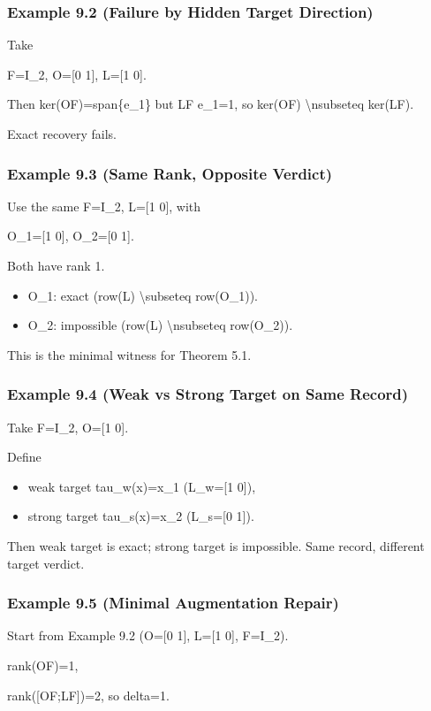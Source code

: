 \documentclass[11pt]{article}
\begin{document}
\subsubsection*{Example 9.2 (Failure by Hidden Target Direction)}
Take


F=I\_2, O=[0 1], L=[1 0].


Then ker(OF)=span\{e\_1\} but LF e\_1=1, so ker(OF) \textbackslash{}nsubseteq ker(LF).

Exact recovery fails.


\subsubsection*{Example 9.3 (Same Rank, Opposite Verdict)}
Use the same F=I\_2, L=[1 0], with


O\_1=[1 0], O\_2=[0 1].


Both have rank 1.

\begin{itemize}
\item O\_1: exact (row(L) \textbackslash{}subseteq row(O\_1)).
\item O\_2: impossible (row(L) \textbackslash{}nsubseteq row(O\_2)).
\end{itemize}

This is the minimal witness for Theorem 5.1.


\subsubsection*{Example 9.4 (Weak vs Strong Target on Same Record)}
Take F=I\_2, O=[1 0].

Define

\begin{itemize}
\item weak target tau\_w(x)=x\_1 (L\_w=[1 0]),
\item strong target tau\_s(x)=x\_2 (L\_s=[0 1]).
\end{itemize}

Then weak target is exact; strong target is impossible. Same record, different target verdict.


\subsubsection*{Example 9.5 (Minimal Augmentation Repair)}
Start from Example 9.2 (O=[0 1], L=[1 0], F=I\_2).


rank(OF)=1,

rank([OF;LF])=2, so delta=1.
\end{document}
